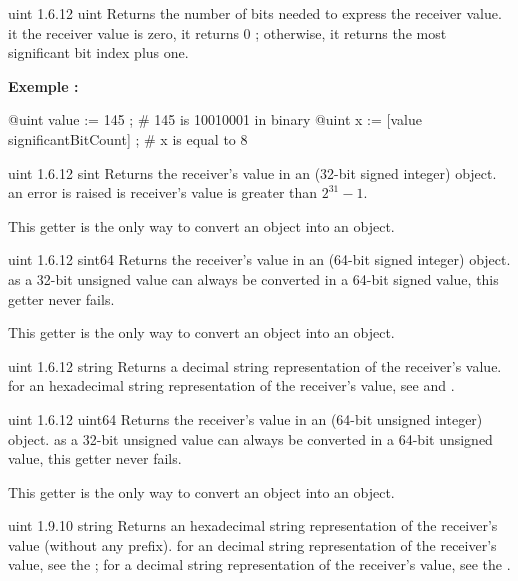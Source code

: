 {uint}
{1.6.12}
{uint}
{Returns the number of bits needed to express the receiver value.}
{it the receiver value is zero, it returns 0 ; otherwise, it returns the most significant bit index plus one.}

\textbf{Exemple :}
\begin{galgascode}
@uint value := 145 ; # 145 is 10010001 in binary
@uint x := [value significantBitCount] ; # x is equal to 8
\end{galgascode}






{uint}
{1.6.12}
{sint}
{Returns the receiver's value in an  (32-bit signed integer) object.}
{an error is raised is receiver's value is greater than $2^{31}-1$.}

This getter is the only way to convert an  object into an  object.




{uint}
{1.6.12}
{sint64}
{Returns the receiver's value in an  (64-bit signed integer) object.}
{as a 32-bit unsigned value can always be converted in a 64-bit signed value, this getter never fails.}

This getter is the only way to convert an  object into an  object.


{uint}
{1.6.12}
{string}
{Returns a decimal string representation of the receiver's value.}
{for an hexadecimal string representation of the receiver's value, see  and .}




{uint}
{1.6.12}
{uint64}
{Returns the receiver's value in an  (64-bit unsigned integer) object.}
{as a 32-bit unsigned value can always be converted in a 64-bit unsigned value, this getter never fails.}

This getter is the only way to convert an  object into an  object.




{uint}
{1.9.10}
{string}
{Returns an hexadecimal string representation of the receiver's value (without any prefix).}
{for an decimal string representation of the receiver's value, see the ; for a decimal string representation of the receiver's value, see the .}






